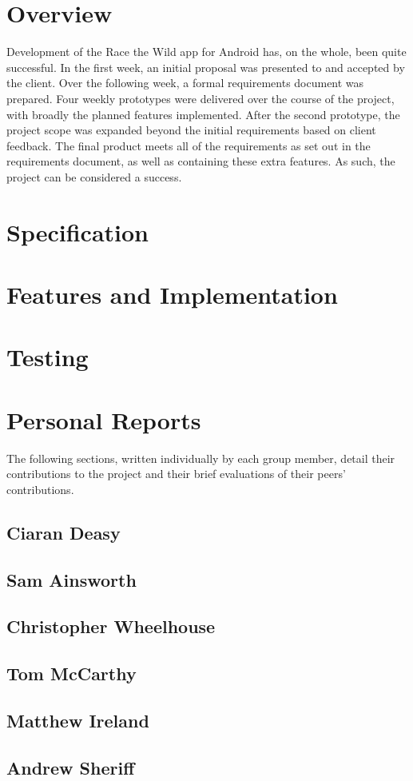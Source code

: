 \documentclass[12pt,a4paper,twoside]{article}
\begin{document}

\newpage
\pagestyle{empty}
\cleardoublepage                             %
\newpage

\section{Overview}

Development of the Race the Wild app for Android has, on the whole, been quite successful. 
In the first week, an initial proposal was presented to and accepted by the client. 
Over the following week, a formal requirements document was prepared. 
Four weekly prototypes were delivered over the course of the project, with broadly the planned features implemented. 
After the second prototype, the project scope was expanded beyond the initial requirements based on client feedback. 
The final product meets all of the requirements as set out in the requirements document, as well as containing these extra features. 
As such, the project can be considered a success.

\section{Specification}



\section{Features and Implementation}

\section{Testing}

\section{Personal Reports}

The following sections, written individually by each group member, detail their contributions to the project and their brief evaluations of their peers' contributions.

\subsection{Ciaran Deasy}

\subsection{Sam Ainsworth}

\subsection{Christopher Wheelhouse}

\subsection{Tom McCarthy}

\subsection{Matthew Ireland}

\subsection{Andrew Sheriff}
\end{document}
